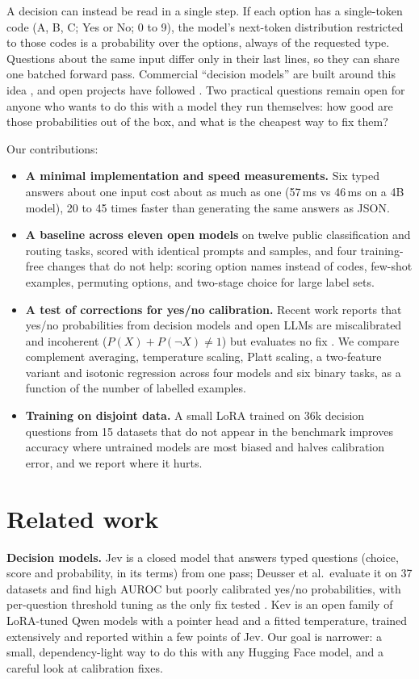 \documentclass[10pt,twocolumn]{article}
\begin{document}
A decision can instead be read in a single step. If each option has a single-token code (A, B, C; Yes or No; 0 to 9),
the model's next-token distribution restricted to those codes is a probability over the options, always of the
requested type. Questions about the same input differ only in their last lines, so they can share one batched forward
pass. Commercial ``decision models'' are built around this idea \cite{jev}, and open projects have followed
\cite{kev}. Two practical questions remain open for anyone who wants to do this with a model they run themselves:
how good are those probabilities out of the box, and what is the cheapest way to fix them?

Our contributions:
\begin{itemize}
\item \textbf{A minimal implementation and speed measurements.} Six typed answers about one input cost about as
much as one (57\,ms vs 46\,ms on a 4B model), 20 to 45 times faster than generating the same answers as JSON.
\item \textbf{A baseline across eleven open models} on twelve public classification and routing tasks, scored with
identical prompts and samples, and four training-free changes that do not help: scoring option names instead of
codes, few-shot examples, permuting options, and two-stage choice for large label sets.
\item \textbf{A test of corrections for yes/no calibration.} Recent work reports that yes/no probabilities from
decision models and open LLMs are miscalibrated and incoherent ($P(X) + P(\lnot X) \neq 1$) but evaluates no fix
\cite{deusser,complement}. We compare complement averaging, temperature scaling, Platt scaling, a two-feature
variant and isotonic regression across four models and six binary tasks, as a function of the number of
labelled examples.
\item \textbf{Training on disjoint data.} A small LoRA trained on 36k decision questions from 15 datasets that do not
appear in the benchmark improves accuracy where untrained models are most biased and halves calibration error, and
we report where it hurts.
\end{itemize}

\section{Related work}

\textbf{Decision models.} Jev \cite{jev} is a closed model that answers typed questions (choice, score and
probability, in its terms) from one pass; Deusser et al.\ evaluate it on 37 datasets and find high AUROC but poorly
calibrated yes/no probabilities, with per-question threshold tuning as the only fix tested \cite{deusser}. Kev
\cite{kev} is an open family of LoRA-tuned Qwen models with a pointer head and a fitted temperature, trained
extensively and reported within a few points of Jev. Our goal is narrower: a small, dependency-light way to do this
with any Hugging Face model, and a careful look at calibration fixes.
\end{document}
